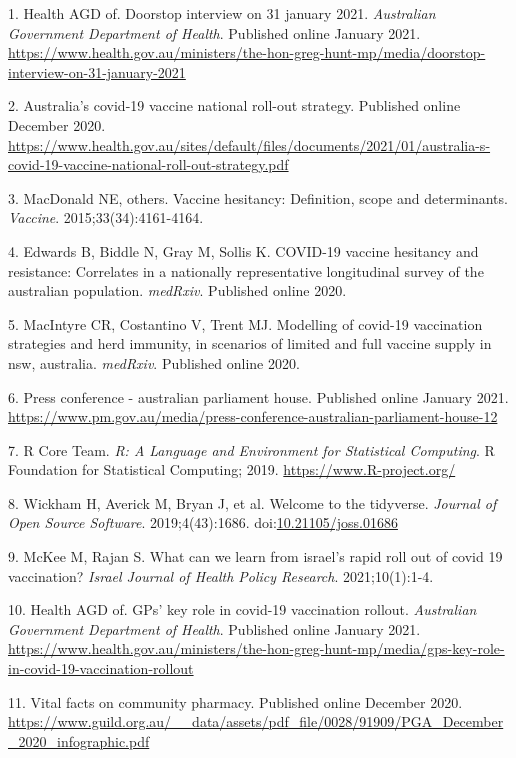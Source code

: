 \documentclass{article}
\newenvironment{cslreferences}%
  {}%
  {\par}
\begin{document}
\hypertarget{refs}{}
\begin{cslreferences}
\leavevmode\hypertarget{ref-gh2021a}{}%
1. Health AGD of. Doorstop interview on 31 january 2021.
\emph{Australian Government Department of Health}. Published online
January 2021.
\url{https://www.health.gov.au/ministers/the-hon-greg-hunt-mp/media/doorstop-interview-on-31-january-2021}

\leavevmode\hypertarget{ref-rolloutStrategy}{}%
2. Australia's covid-19 vaccine national roll-out strategy. Published
online December 2020.
\url{https://www.health.gov.au/sites/default/files/documents/2021/01/australia-s-covid-19-vaccine-national-roll-out-strategy.pdf}

\leavevmode\hypertarget{ref-macdonald2015vaccine}{}%
3. MacDonald NE, others. Vaccine hesitancy: Definition, scope and
determinants. \emph{Vaccine}. 2015;33(34):4161-4164.

\leavevmode\hypertarget{ref-edwards2020covid}{}%
4. Edwards B, Biddle N, Gray M, Sollis K. COVID-19 vaccine hesitancy and
resistance: Correlates in a nationally representative longitudinal
survey of the australian population. \emph{medRxiv}. Published online
2020.

\leavevmode\hypertarget{ref-macintyre2020modelling}{}%
5. MacIntyre CR, Costantino V, Trent MJ. Modelling of covid-19
vaccination strategies and herd immunity, in scenarios of limited and
full vaccine supply in nsw, australia. \emph{medRxiv}. Published online
2020.

\leavevmode\hypertarget{ref-pm2021}{}%
6. Press conference - australian parliament house. Published online
January 2021.
\url{https://www.pm.gov.au/media/press-conference-australian-parliament-house-12}

\leavevmode\hypertarget{ref-R-base}{}%
7. R Core Team. \emph{R: A Language and Environment for Statistical
Computing}. R Foundation for Statistical Computing; 2019.
\url{https://www.R-project.org/}

\leavevmode\hypertarget{ref-tidyverse2019}{}%
8. Wickham H, Averick M, Bryan J, et al. Welcome to the tidyverse.
\emph{Journal of Open Source Software}. 2019;4(43):1686.
doi:\href{https://doi.org/10.21105/joss.01686}{10.21105/joss.01686}

\leavevmode\hypertarget{ref-mckee2021can}{}%
9. McKee M, Rajan S. What can we learn from israel's rapid roll out of
covid 19 vaccination? \emph{Israel Journal of Health Policy Research}.
2021;10(1):1-4.

\leavevmode\hypertarget{ref-gh2021b}{}%
10. Health AGD of. GPs' key role in covid-19 vaccination rollout.
\emph{Australian Government Department of Health}. Published online
January 2021.
\url{https://www.health.gov.au/ministers/the-hon-greg-hunt-mp/media/gps-key-role-in-covid-19-vaccination-rollout}

\leavevmode\hypertarget{ref-pga2020}{}%
11. Vital facts on community pharmacy. Published online December 2020.
\url{https://www.guild.org.au/__data/assets/pdf_file/0028/91909/PGA_December_2020_infographic.pdf}
\end{cslreferences}



\end{document}
